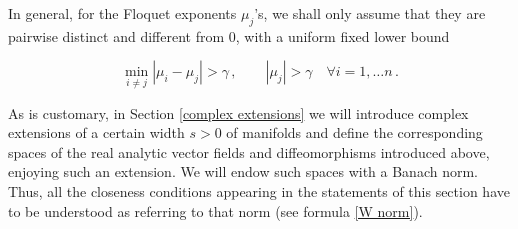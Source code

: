 \documentclass[oneside, 11pt]{amsbook}
\def\a{\alpha}
\def\Id{\rm Id}
\newcommand{\U}{\mathcal{U}}
\newcommand{\T}{\mathbb{T}}
\newcommand{\R}{\mathbb{R}}
\newcommand{\teta}{\theta}
\newcommand{\eps}{\varepsilon}
\newcommand{\id}{\operatorname{id}}
\def\U{{\mathcal U}}
\newcommand{\0}{{(0)}}
\newcommand{\3}{{(3)}}
\newcommand{\red}[1]{\textcolor{red}{#1}}
\newtheorem{thm}{Theorem}[section]
\newtheorem{rmk}{Remark}[section]
\numberwithin{equation}{section}
\numberwithin{defn}{section}
\numberwithin{prop}{section}
\numberwithin{cor}{section}
\numberwithin{lemma}{section}
\numberwithin{rmk}{section}
\numberwithin{corollary}{section}
\begin{document}
In general, for the Floquet exponents $\mu_j$'s, we shall only assume that they are pairwise distinct and different from $0$, with a uniform fixed lower bound 

\begin{equation}\label{mu conditions}
    \min_{i\neq j} |\mu_i - \mu_j| > \gamma\,, \quad \quad |\mu_j| > \gamma \quad \forall i=1,\ldots n\,.
\end{equation}


%
%


As is customary, in Section \ref{complex extensions} we will introduce complex extensions of a certain width $s>0$ of manifolds and define the corresponding
spaces of the real analytic vector fields and diffeomorphisms introduced above, enjoying such an extension. We will endow such spaces
with a Banach norm. Thus, all the closeness conditions appearing in the statements of this
section have to be understood as referring to that norm (see formula \eqref{W norm}).  

\medskip


\end{document}
